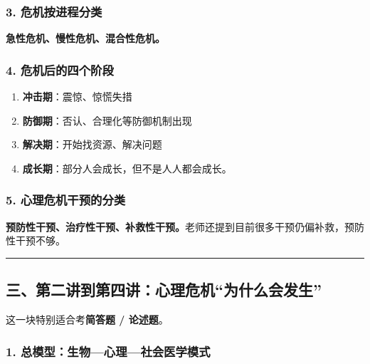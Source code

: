 \documentclass[
  a4paper,
]{ctexart}
\providecommand{\tightlist}{%
  \setlength{\itemsep}{0pt}\setlength{\parskip}{0pt}}
\begin{document}
\subsubsection{3.
危机按进程分类}\label{ux5371ux673aux6309ux8fdbux7a0bux5206ux7c7b}

\textbf{急性危机、慢性危机、混合性危机。}

\subsubsection{4.
危机后的四个阶段}\label{ux5371ux673aux540eux7684ux56dbux4e2aux9636ux6bb5}

\begin{enumerate}
\def\labelenumi{\arabic{enumi}.}
\tightlist
\item
  \textbf{冲击期}：震惊、惊慌失措
\item
  \textbf{防御期}：否认、合理化等防御机制出现
\item
  \textbf{解决期}：开始找资源、解决问题
\item
  \textbf{成长期}：部分人会成长，但不是人人都会成长。
\end{enumerate}

\subsubsection{5.
心理危机干预的分类}\label{ux5fc3ux7406ux5371ux673aux5e72ux9884ux7684ux5206ux7c7b}

\textbf{预防性干预、治疗性干预、补救性干预。}老师还提到目前很多干预仍偏补救，预防性干预不够。

\begin{center}\rule{0.5\linewidth}{0.5pt}\end{center}

\subsection{三、第二讲到第四讲：心理危机``为什么会发生''}\label{ux4e09ux7b2cux4e8cux8bb2ux5230ux7b2cux56dbux8bb2ux5fc3ux7406ux5371ux673aux4e3aux4ec0ux4e48ux4f1aux53d1ux751f}

这一块特别适合考\textbf{简答题 / 论述题}。

\subsubsection{1.
总模型：生物---心理---社会医学模式}\label{ux603bux6a21ux578bux751fux7269ux5fc3ux7406ux793eux4f1aux533bux5b66ux6a21ux5f0f}
\end{document}
